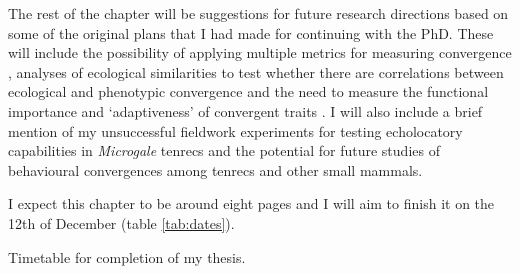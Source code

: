 \documentclass[12pt,a4paper]{article}
\begin{document}
	The rest of the chapter will be suggestions for future research directions based on some of the original plans that I had made for continuing with the PhD. These will include the possibility of applying multiple metrics for measuring convergence \citep[e.g.][]{Ingram2013, Segar2013, Harmon2005}, analyses of ecological similarities to test whether there are correlations between ecological and phenotypic convergence \citep[e.g.][]{Moen2013} and the need to measure the functional importance and `adaptiveness' of convergent traits \citep{Losos2010}. I will also include a brief mention of my unsuccessful fieldwork experiments for testing echolocatory capabilities in \textit{Microgale} tenrecs and the potential for future studies of behavioural convergences among tenrecs and other small mammals.

	I expect this chapter to be around eight pages and I will aim to finish it on the 12th of December (table \ref{tab:dates}).



	\begin{table}[h]			
	\caption
		{Timetable for completion of my thesis.}
	\centering
	 
	\label{tab:dates}  
	\end{table}


 
\end{document}
